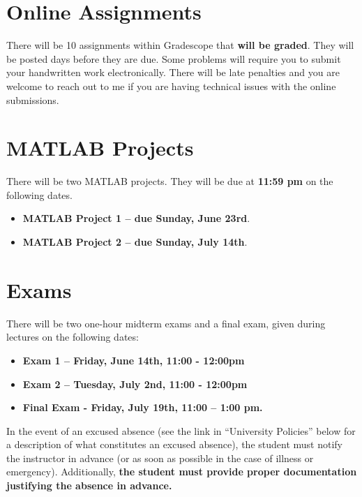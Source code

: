 \documentclass[a4paper,10pt]{article}
\begin{document}

\section{Online Assignments}
There will be 10 assignments within Gradescope that \textbf{will be graded}. They will be posted days before they are due. Some problems will require you to submit your handwritten work electronically. There will be late penalties and you are welcome to reach out to me if you are having technical issues with the online submissions.

\section{MATLAB Projects}
There will be two MATLAB projects. They will be due at \textbf{11:59 pm} on the following dates.
\begin{itemize}
\item \textbf{MATLAB Project 1 – due Sunday, June 23rd}.
\item \textbf{MATLAB Project 2 – due Sunday, July 14th}.
\end{itemize}

\section{Exams}
There will be two one-hour midterm exams and a final exam, given during lectures on the following dates:
\begin{itemize}
\item \textbf{Exam 1 – Friday, June 14th, 11:00 - 12:00pm}
\item \textbf{Exam 2 – Tuesday, July 2nd, 11:00 - 12:00pm}
\item \textbf{Final Exam - Friday, July 19th, 11:00 – 1:00 pm.}
\end{itemize}
In the event of an excused absence (see the link in “University Policies” below for a description of what constitutes an excused absence), the student must notify the instructor in advance (or as soon as possible in the case of illness or emergency). Additionally, \textbf{the student must provide proper documentation justifying the absence in advance.}
\end{document}
